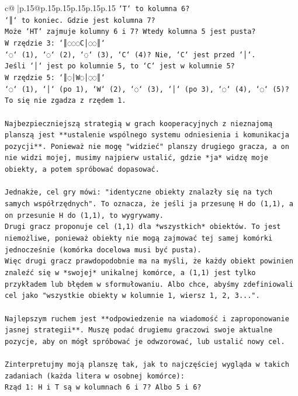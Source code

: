 \documentclass{article}
\begin{document}
{\begin{supertabular}{c@{$\;$}|p{.15\linewidth}@{}p{.15\linewidth}p{.15\linewidth}p{.15\linewidth}p{.15\linewidth}p{.15\linewidth}}
{{{\texttt{`T` to kolumna 6?} \\
\texttt{`║` to koniec. Gdzie jest kolumna 7?} \\
\texttt{Może `HT` zajmuje kolumny 6 i 7? Wtedy kolumna 5 jest pusta?} \\
\texttt{W rzędzie 3: `║◌◌◌C│◌◌║`} \\
\texttt{`◌` (1), `◌` (2), `◌` (3), `C` (4)? Nie, `C` jest przed `│`.} \\
\texttt{Jeśli `│` jest po kolumnie 5, to `C` jest w kolumnie 5?} \\
\texttt{W rzędzie 5: `║◌│W◌│◌◌║`} \\
\texttt{`◌` (1), `│` (po 1), `W` (2), `◌` (3), `│` (po 3), `◌` (4), `◌` (5)?} \\
\texttt{To się nie zgadza z rzędem 1.} \\
\\ 
\texttt{Najbezpieczniejszą strategią w grach kooperacyjnych z nieznajomą planszą jest **ustalenie wspólnego systemu odniesienia i komunikacja pozycji**. Ponieważ nie mogę "widzieć" planszy drugiego gracza, a on nie widzi mojej, musimy najpierw ustalić, gdzie *ja* widzę moje obiekty, a potem spróbować dopasować.} \\
\\ 
\texttt{Jednakże, cel gry mówi: "identyczne obiekty znalazły się na tych samych współrzędnych". To oznacza, że jeśli ja przesunę H do (1,1), a on przesunie H do (1,1), to wygrywamy.} \\
\texttt{Drugi gracz proponuje cel (1,1) dla *wszystkich* obiektów. To jest niemożliwe, ponieważ obiekty nie mogą zajmować tej samej komórki jednocześnie (komórka docelowa musi być pusta).} \\
\texttt{Więc drugi gracz prawdopodobnie ma na myśli, że każdy obiekt powinien znaleźć się w *swojej* unikalnej komórce, a (1,1) jest tylko przykładem lub błędem w sformułowaniu. Albo chce, abyśmy zdefiniowali cel jako "wszystkie obiekty w kolumnie 1, wiersz 1, 2, 3...".} \\
\\ 
\texttt{Najlepszym ruchem jest **odpowiedzenie na wiadomość i zaproponowanie jasnej strategii**. Muszę podać drugiemu graczowi swoje aktualne pozycje, aby on mógł spróbować je odwzorować, lub ustalić nowy cel.} \\
\\ 
\texttt{Zinterpretujmy moją planszę tak, jak to najczęściej wygląda w takich zadaniach (każda litera w osobnej komórce):} \\
\texttt{Rząd 1: H i T są w kolumnach 6 i 7? Albo 5 i 6?} \\
}}}
\end{supertabular}}
\end{document}
